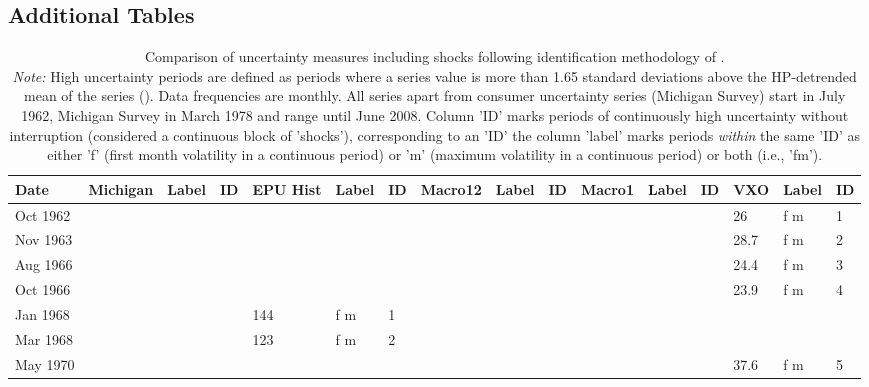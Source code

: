 \documentclass[a4paper,11pt,listof=nochaptergap,oneside,pointednumbers,bibtotoc,bigheadings,liststotoc]{scrbook}
\theoremstyle{mysatz}
\theoremstyle{mydefinition}
\theoremstyle{mybemerkung}
\begin{document}
\begin{itemize}
\section{Additional Tables}
\label{sec:additionalTables}
\begin{spacing}{.3}
\begin{landscape}
    \centering
    \begin{scriptsize}
    \begin{longtable}{|l|lll|lll|lll|lll|lll|}
    \caption[Comparison of uncertainty measures including shocks following identification methodology of \citet{bloom:09}.]{Comparison of uncertainty measures including shocks following identification methodology of \citet{bloom:09}. \\
    \textit{Note:} High uncertainty periods are defined as periods where a series value is more than 1.65 standard deviations above the HP-detrended mean of the series (\citealp{bloom:09}). Data frequencies are monthly. All series apart from consumer uncertainty series (Michigan Survey) start in July 1962, Michigan Survey in March 1978 and range until June 2008. Column 'ID' marks periods of continuously high uncertainty without interruption (considered a continuous block of 'shocks'), corresponding to an 'ID' the column 'label' marks periods \textit{within} the same 'ID' as either 'f' (first month volatility in a continuous period) or 'm' (maximum volatility in a continuous period) or both (i.e., 'fm').}\\    %
\toprule
    \textbf{Date} & \textbf{Michigan} & \textbf{Label} & \textbf{ID} & \textbf{EPU Hist} & \textbf{Label} & \textbf{ID} & \textbf{Macro12} & \textbf{Label} & \textbf{ID} & \textbf{Macro1} & \textbf{Label} & \textbf{ID} & \textbf{VXO} & \textbf{Label} & \textbf{ID} \\ 
    \midrule
    \endhead
       Oct 1962 &  &  &  &  &  &  &  &  &  &  &  &  & 26 & f m & 1 \\
        Nov 1963 &  &  &  &  &  &  &  &  &  &  &  &  & 28.7 & f m & 2 \\
        Aug 1966 &  &  &  &  &  &  &  &  &  &  &  &  & 24.4 & f m & 3 \\
        Oct 1966 &  &  &  &  &  &  &  &  &  &  &  &  & 23.9 & f m & 4 \\
        Jan 1968 &  &  &  & 144 & f m & 1 &  &  &  &  &  &  &  &  &  \\
        Mar 1968 &  &  &  & 123 & f m & 2 &  &  &  &  &  &  &  &  &  \\
        May 1970 &  &  &  &  &  &  &  &  &  &  &  &  & 37.6 & f m & 5 \\

\end{longtable}
\end{scriptsize}
\end{landscape}
\end{spacing}
\end{itemize}
\end{document}
